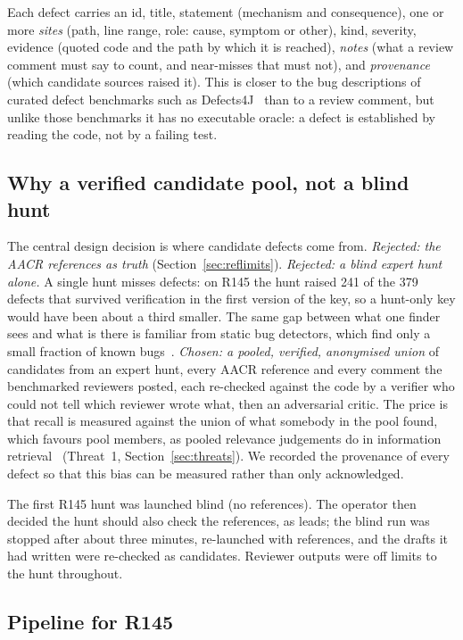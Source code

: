 \documentclass[11pt,a4paper]{article}
\begin{document}
Each defect carries an id, title, statement (mechanism and consequence),
one or more \emph{sites} (path, line range, role: cause, symptom or other),
kind, severity, evidence (quoted code and the path by which it is reached),
\emph{notes} (what a review comment must say to count, and near-misses that
must not), and \emph{provenance} (which candidate sources raised it). This
is closer to the bug descriptions of curated defect benchmarks such as
Defects4J~\cite{defects4j} than to a review comment, but unlike those
benchmarks it has no executable oracle: a defect is established by reading
the code, not by a failing test.

\subsection{Why a verified candidate pool, not a blind hunt}

The central design decision is where candidate defects come from.
\emph{Rejected: the AACR references as truth} (Section~\ref{sec:reflimits}).
\emph{Rejected: a blind expert hunt alone.} A single hunt misses defects: on
R145 the hunt raised 241 of the 379 defects that survived verification in the
first version of the key, so a hunt-only key would have been about a third
smaller. The same gap between what one finder sees and what is there is
familiar from static bug detectors, which find only a small fraction of
known bugs~\cite{habib2018}. \emph{Chosen: a pooled, verified, anonymised
union} of candidates from an expert hunt, every AACR reference and every
comment the benchmarked reviewers posted, each re-checked against the code
by a verifier who could not tell which reviewer wrote what, then an
adversarial critic. The price is that recall is measured against the union
of what somebody in the pool found, which favours pool members, as pooled
relevance judgements do in information
retrieval~\cite{sparckjones1975,zobel1998,buckley2007}
(Threat~1, Section~\ref{sec:threats}). We recorded the provenance of every
defect so that this bias can be measured rather than only acknowledged.

The first R145 hunt was launched blind (no references). The operator then
decided the hunt should also check the references, as leads; the blind run
was stopped after about three minutes, re-launched with references, and the
drafts it had written were re-checked as candidates. Reviewer
outputs were off limits to the hunt throughout.

\subsection{Pipeline for R145}
\label{sec:gtpipeline}
\end{document}
